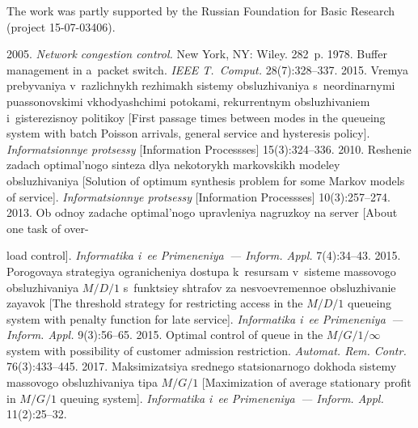 


\Ack
\noindent
The work was partly supported by
the Russian Foundation for Basic Research (project 15-07-03406).




  \begin{multicols}{2}

\renewcommand{\bibname}{\protect\rmfamily References}

{\small\frenchspacing
 {%
 \begin{thebibliography}{99}
 2005. \textit{Network congestion control.} New York, NY: 
Wiley. 282~p.
 1978. Buffer management in a~packet switch. \textit{IEEE T.~Comput.} 28(7):328--337.  
 2015. Vremya prebyvaniya 
v~razlichnykh rezhimakh sistemy obsluzhivaniya s~neordinarnymi 
puassonovskimi vkhodyashchimi potokami, rekurrentnym obsluzhivaniem 
i~gisterezisnoy politikoy [First passage times between modes in the queueing 
system with batch Poisson arrivals, general service and hysteresis policy]. 
\textit{Informatsionnye protsessy} [Information Processses] 15(3):324--336.
 2010. Reshenie zadach optimal'nogo sinteza dlya 
nekotorykh markovskikh modeley obsluzhivaniya [Solution of optimum synthesis 
problem for some Markov models of service]. \textit{Informatsionnye protsessy} 
[Information Processses] 10(3):257--274.
 2013. Ob odnoy zadache optimal'nogo upravleniya 
nagruzkoy na server [About one task of over-\linebreak\vspace*{-12pt}

\columnbreak

\noindent
load control]. \textit{Informatika i~ee 
Primeneniya~--- Inform. Appl.} 7(4):34--43.
 2015. Porogovaya strategiya ogranicheniya dostupa 
k~resursam v~sisteme massovogo obsluzhivaniya $M/D/1$ s~funktsiey shtrafov za nesvoevremennoe 
obsluzhivanie zayavok [The threshold strategy for restricting access in the 
$M/D/1$ queueing system with penalty function for late service]. 
\textit{Informatika i~ee Primeneniya~--- Inform. Appl.} 9(3):56--65. 
 2015. Optimal control 
of queue in the $M/G/1/\infty$ system with possibility of customer admission 
restriction. \textit{Automat. Rem. Contr.}   76(3):433--445.
 2017. Maksimizatsiya srednego sta\-tsi\-o\-nar\-no\-go dokhoda 
sistemy massovogo obsluzhivaniya tipa $M/G/1$ [Maximization of average stationary profit in $M/G/1$ 
queuing system]. \textit{Informatika i~ee Primeneniya~--- Inform. Appl.}  
11(2):25--32.  



\end{thebibliography}}}
\end{multicols}
